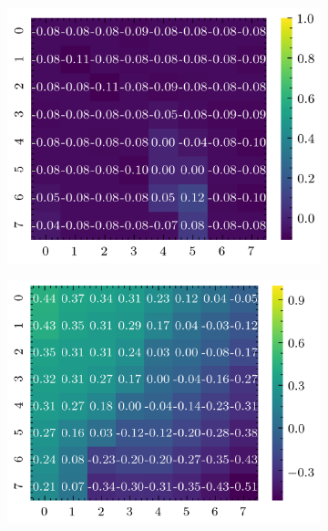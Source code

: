 \documentclass[../document.tex]{subfiles}
\begin{document}
\begin{figure}[H]
\begin{subfigure}[b]{0.19\textwidth}
        \includegraphics[width=\linewidth]{../img/5/quarry/false_negative/heatmap-2d-2.png}
    \end{subfigure}
    \begin{subfigure}[b]{0.19\textwidth}
        \includegraphics[width=\linewidth]{../img/5/quarry/false_negative/heatmap-2d-3.png}
    \end{subfigure}  
    \begin{subfigure}[b]{0.19\textwidth}

\end{subfigure}
\end{figure}
\end{document}
